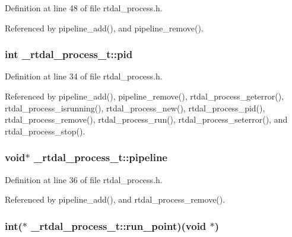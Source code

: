 Definition at line 48 of file rtdal\-\_\-process.\-h.



Referenced by pipeline\-\_\-add(), and pipeline\-\_\-remove().

\hypertarget{struct__rtdal__process__t_a7826a585e78280654a2cf5e2c07d318e}{
\subsubsection[{pid}]{\setlength{\rightskip}{0pt plus 5cm}int \-\_\-rtdal\-\_\-process\-\_\-t\-::pid}}\label{struct__rtdal__process__t_a7826a585e78280654a2cf5e2c07d318e}


Definition at line 34 of file rtdal\-\_\-process.\-h.



Referenced by pipeline\-\_\-add(), pipeline\-\_\-remove(), rtdal\-\_\-process\-\_\-geterror(), rtdal\-\_\-process\-\_\-isrunning(), rtdal\-\_\-process\-\_\-new(), rtdal\-\_\-process\-\_\-pid(), rtdal\-\_\-process\-\_\-remove(), rtdal\-\_\-process\-\_\-run(), rtdal\-\_\-process\-\_\-seterror(), and rtdal\-\_\-process\-\_\-stop().

\hypertarget{struct__rtdal__process__t_a9ec4e6cea3e83c2d3f6b575545975b30}{
\subsubsection[{pipeline}]{\setlength{\rightskip}{0pt plus 5cm}void$\ast$ \-\_\-rtdal\-\_\-process\-\_\-t\-::pipeline}}\label{struct__rtdal__process__t_a9ec4e6cea3e83c2d3f6b575545975b30}


Definition at line 36 of file rtdal\-\_\-process.\-h.



Referenced by pipeline\-\_\-add(), and rtdal\-\_\-process\-\_\-remove().

\hypertarget{struct__rtdal__process__t_a95c19062dd6dc2a8b5d03adc03fa97df}{
\subsubsection[{run\-\_\-point}]{\setlength{\rightskip}{0pt plus 5cm}int($\ast$ \-\_\-rtdal\-\_\-process\-\_\-t\-::run\-\_\-point)(void $\ast$)}}\label{struct__rtdal__process__t_a95c19062dd6dc2a8b5d03adc03fa97df}


